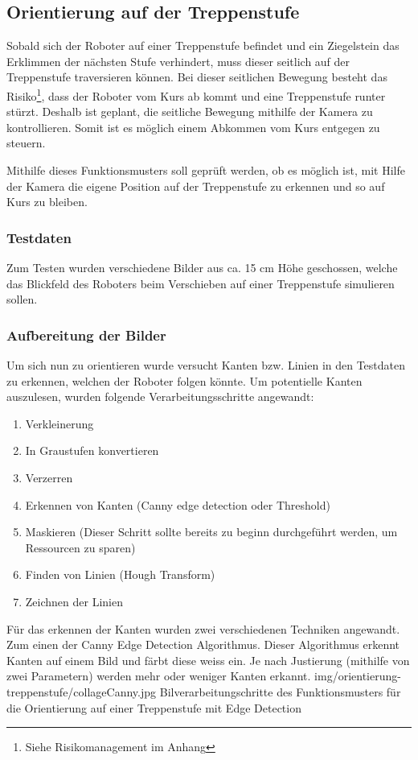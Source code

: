 \subsection{Orientierung auf der Treppenstufe}
\label{orientierungAufTreppenstufe}
Sobald sich der Roboter auf einer Treppenstufe befindet und ein Ziegelstein das Erklimmen der nächsten Stufe verhindert, muss dieser seitlich auf der Treppenstufe traversieren können. Bei dieser seitlichen Bewegung besteht das Risiko\footnote{Siehe Risikomanagement im Anhang}, dass der Roboter vom Kurs ab kommt und eine Treppenstufe runter stürzt.
Deshalb ist geplant, die seitliche Bewegung mithilfe der Kamera zu kontrollieren. Somit ist es möglich einem Abkommen vom Kurs entgegen zu steuern.

Mithilfe dieses Funktionsmusters soll geprüft werden, ob es möglich ist, mit Hilfe der Kamera die eigene Position auf der Treppenstufe zu erkennen und so auf Kurs zu bleiben. 

\subsubsection{Testdaten}
Zum Testen wurden verschiedene Bilder aus ca. 15 cm Höhe geschossen, welche das Blickfeld des Roboters beim Verschieben auf einer Treppenstufe simulieren sollen.

\subsubsection{Aufbereitung der Bilder}
\label{aufbereitungDerBilder}
Um sich nun zu orientieren wurde versucht Kanten bzw. Linien in den Testdaten zu erkennen, welchen der Roboter folgen könnte. Um potentielle Kanten auszulesen, wurden folgende Verarbeitungsschritte angewandt:
\begin{enumerate}
    \item Verkleinerung
    \item In Graustufen konvertieren
    \item Verzerren
    \item Erkennen von Kanten (Canny edge detection oder Threshold)
    \item Maskieren (Dieser Schritt sollte bereits zu beginn durchgeführt werden, um Ressourcen zu sparen)
    \item Finden von Linien (Hough Transform)
    \item Zeichnen der Linien
\end{enumerate}
Für das erkennen der Kanten wurden zwei verschiedenen Techniken angewandt. Zum einen der Canny Edge Detection Algorithmus\cite{OpenCV-Canny}. Dieser Algorithmus erkennt Kanten auf einem Bild und färbt diese weiss ein. Je nach Justierung (mithilfe von zwei Parametern) werden mehr oder weniger Kanten erkannt.
\image
  {img/orientierung-treppenstufe/collageCanny.jpg}
  {Bilverarbeitungschritte des Funktionsmusters für die Orientierung auf einer Treppenstufe mit Edge Detection}
  
